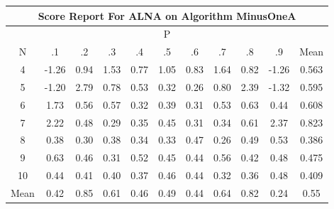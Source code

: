 \documentclass[11pt,a4paper]{report}
\begin{document}
\begin{longtable}{ | c || c | c | c | c | c | c | c | c | c || c |}
\hline
\multicolumn{11}{|c|}{ Score Report For ALNA on Algorithm MinusOneA} \\
\hline
\multicolumn{11}{|c|}{ P } \\
\hline
N & .1 & .2 & .3 & .4 & .5 & .6 & .7 & .8 & .9 & Mean\\
 \hline
 \hline
 \endhead
  4 &  \cellcolor[HTML]{FFDFDF} -1.26 &  \cellcolor[HTML]{E7E7FF} 0.94 &  \cellcolor[HTML]{D7D7FF} 1.53 &  \cellcolor[HTML]{EFEFFF} 0.77 &  \cellcolor[HTML]{E7E7FF} 1.05 &  \cellcolor[HTML]{E7E7FF} 0.83 &  \cellcolor[HTML]{D7D7FF} 1.64 &  \cellcolor[HTML]{E7E7FF} 0.82 &  \cellcolor[HTML]{FFDFDF} -1.26 & 0.563 \\
  5 &  \cellcolor[HTML]{FFDFDF} -1.20 &  \cellcolor[HTML]{B7B7FF} 2.79 &  \cellcolor[HTML]{EFEFFF} 0.78 &  \cellcolor[HTML]{EFEFFF} 0.53 &  \cellcolor[HTML]{F7F7FF} 0.32 &  \cellcolor[HTML]{F7F7FF} 0.26 &  \cellcolor[HTML]{E7E7FF} 0.80 &  \cellcolor[HTML]{BFBFFF} 2.39 &  \cellcolor[HTML]{FFDFDF} -1.32 & 0.595 \\
  6 &  \cellcolor[HTML]{D7D7FF} 1.73 &  \cellcolor[HTML]{EFEFFF} 0.56 &  \cellcolor[HTML]{EFEFFF} 0.57 &  \cellcolor[HTML]{F7F7FF} 0.32 &  \cellcolor[HTML]{F7F7FF} 0.39 &  \cellcolor[HTML]{F7F7FF} 0.31 &  \cellcolor[HTML]{EFEFFF} 0.53 &  \cellcolor[HTML]{EFEFFF} 0.63 &  \cellcolor[HTML]{F7F7FF} 0.44 & 0.608 \\
  7 &  \cellcolor[HTML]{C7C7FF} 2.22 &  \cellcolor[HTML]{EFEFFF} 0.48 &  \cellcolor[HTML]{F7F7FF} 0.29 &  \cellcolor[HTML]{F7F7FF} 0.35 &  \cellcolor[HTML]{F7F7FF} 0.45 &  \cellcolor[HTML]{F7F7FF} 0.31 &  \cellcolor[HTML]{F7F7FF} 0.34 &  \cellcolor[HTML]{EFEFFF} 0.61 &  \cellcolor[HTML]{C7C7FF} 2.37 & 0.823 \\
  8 &  \cellcolor[HTML]{F7F7FF} 0.38 &  \cellcolor[HTML]{F7F7FF} 0.30 &  \cellcolor[HTML]{F7F7FF} 0.38 &  \cellcolor[HTML]{F7F7FF} 0.34 &  \cellcolor[HTML]{F7F7FF} 0.33 &  \cellcolor[HTML]{F7F7FF} 0.47 &  \cellcolor[HTML]{F7F7FF} 0.26 &  \cellcolor[HTML]{EFEFFF} 0.49 &  \cellcolor[HTML]{EFEFFF} 0.53 & 0.386 \\
  9 &  \cellcolor[HTML]{EFEFFF} 0.63 &  \cellcolor[HTML]{F7F7FF} 0.46 &  \cellcolor[HTML]{F7F7FF} 0.31 &  \cellcolor[HTML]{EFEFFF} 0.52 &  \cellcolor[HTML]{F7F7FF} 0.45 &  \cellcolor[HTML]{F7F7FF} 0.44 &  \cellcolor[HTML]{EFEFFF} 0.56 &  \cellcolor[HTML]{F7F7FF} 0.42 &  \cellcolor[HTML]{EFEFFF} 0.48 & 0.475 \\
  10 &  \cellcolor[HTML]{F7F7FF} 0.44 &  \cellcolor[HTML]{F7F7FF} 0.41 &  \cellcolor[HTML]{F7F7FF} 0.40 &  \cellcolor[HTML]{F7F7FF} 0.37 &  \cellcolor[HTML]{F7F7FF} 0.46 &  \cellcolor[HTML]{F7F7FF} 0.44 &  \cellcolor[HTML]{F7F7FF} 0.32 &  \cellcolor[HTML]{F7F7FF} 0.36 &  \cellcolor[HTML]{EFEFFF} 0.48 & 0.409 \\
 \hline
 \hline
Mean &  \cellcolor[HTML]{F7F7FF} 0.42 &  \cellcolor[HTML]{E7E7FF} 0.85 &  \cellcolor[HTML]{EFEFFF} 0.61 &  \cellcolor[HTML]{F7F7FF} 0.46 &  \cellcolor[HTML]{EFEFFF} 0.49 &  \cellcolor[HTML]{F7F7FF} 0.44 &  \cellcolor[HTML]{EFEFFF} 0.64 &  \cellcolor[HTML]{E7E7FF} 0.82 &  \cellcolor[HTML]{F7F7FF} 0.24 &  \cellcolor[HTML]{EFEFFF} 0.55
\end{longtable}
\end{document}
